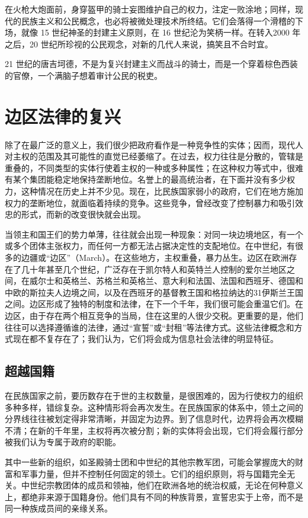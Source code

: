 在火枪大炮面前，身穿盔甲的骑士妄图维护自己的权力，注定一败涂地；同样，现代的民族主义和公民概念，也必将被微处理技术所终结。它们会落得一个滑稽的下场，就像 15 世纪神圣的封建主义原则，在 16 世纪沦为笑柄一样。在转入2000 年之后，20 世纪所珍视的公民观念，对新的几代人来说，搞笑且不合时宜。


21 世纪的唐吉坷德，不是为复兴封建主义而战斗的骑士，而是一个穿着棕色西装的官僚，一个满脑子想着审计公民的税吏。


\section{边区法律的复兴}
除了在最广泛的意义上，我们很少把政府看作是一种竞争性的实体；因而，现代人对主权的范围及其可能性的直觉已经萎缩了。在过去，权力往往是分散的，管辖是重叠的，不同类型的实体行使着主权的一种或多种属性；在这种权力等式中，很难有某个集团能稳定地保持垄断地位。名誉上的最高统治者，在下面并没有多少权力，这种情况在历史上并不少见。现在，比民族国家弱小的政府，它们在地方施加权力的垄断地位，就面临着持续的竞争。这些竞争，曾经改变了控制暴力和吸引效忠的形式，而新的改变很快就会出现。


当领主和国王们的势力单薄，往往就会出现一种现象：对同一块边境地区，有一个或多个团体主张权力，而任何一方都无法占据决定性的支配地位。在中世纪，有很多的边疆或“边区”（March）。在这些地方，主权重叠，暴力丛生。边区在欧洲存在了几十年甚至几个世纪，广泛存在于凯尔特人和英特兰人控制的爱尔兰地区之间，在威尔士和英格兰、苏格兰和英格兰、意大利和法国、法国和西班牙、德国和中欧的斯拉夫人边境之间，以及在西班牙的基督教王国和格拉纳达的31伊斯兰王国之间。边区形成了独特的制度和法律，在下一个千年，我们很可能会重温它们。在边区，由于存在两个相互竞争的当局，住在这里的人很少交税。更重要的是，他们往往可以选择遵循谁的法律，通过“宣誓”或“封租”等法律方式。这些法律概念和方式现在都不复存在了；我们认为，它们将会成为信息社会法律的明显特征。


\subsection{超越国籍}
在民族国家之前，要历数存在于世的主权数量，是很困难的，因为行使权力的组织多种多样，错综复杂。这种情形将会再次发生。在民族国家的体系中，领土之间的分界线往往被划定得非常清晰，并固定为边界。到了信息时代，边界将会再次模糊不清；在新的千年里，主权将再次被分割；新的实体将会出现，它们将会履行部分被我们认为专属于政府的职能。


其中一些新的组织，如圣殿骑士团和中世纪的其他宗教军团，可能会掌握庞大的财富和军事力量，但并不控制任何固定的领土。它们的组织原则，将与国籍完全无关。中世纪宗教团体的成员和领袖，他们在欧洲各地的统治权威，无论在何种意义上，都绝非来源于国籍身份。他们具有不同的种族背景，宣誓忠实于上帝，而不是同一种族成员间的亲缘关系。


